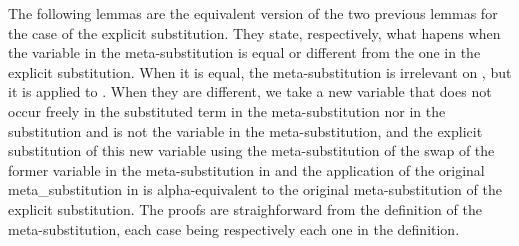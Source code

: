 The following lemmas are the equivalent version of the two previous lemmas for the case of the explicit substitution. They state, respectively, what hapens when the variable in the meta-substitution is equal or different from the one in the explicit substitution. When it is equal, the meta-substitution is irrelevant on , but it is applied to . When they are different, we take a new variable that does not occur freely in the substituted term in the meta-substitution nor in the substitution and is not the variable in the meta-substitution, and the explicit substitution of this new variable using the meta-substitution of the swap of the former variable in the meta-substitution in  and the application of the original meta\_substitution in  is alpha-equivalent to the original meta-substitution of the explicit substitution. The proofs are straighforward from the definition of the meta-substitution, each case being respectively each one in the definition. \newline
